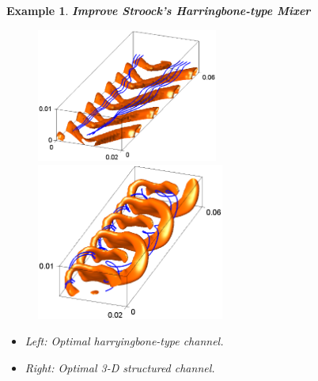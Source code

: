 \documentclass[dvips,landscape]{foils}
\newtheorem{example}{Example}
\begin{document}
\begin{example}{\bfseries Improve Stroock's Harringbone-type Mixer}
  \begin{figure}
    \centerline{
       \includegraphics[width=0.53\textwidth,trim=1cm 0cm 0cm 0cm,clip]{myharringbonestructure}
       \includegraphics[width=0.55\textwidth,trim=1cm 0cm 1cm 0cm,clip]{my3dstructure}     
    }
  \end{figure}
\begin{itemize}\setlength{\parskip}{0pt}  \setlength{\itemsep}{10pt} \setlength{\topsep}{0pt}
\item Left: Optimal harryingbone-type channel.
\item Right: Optimal 3-D structured channel.  
\end{itemize}


\end{example}
\end{document}
